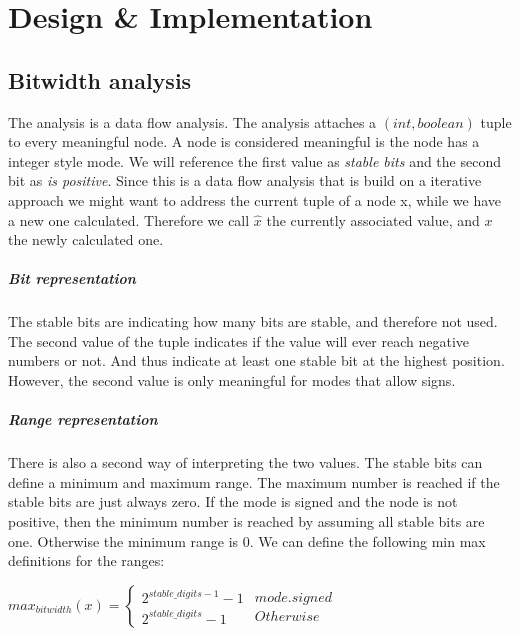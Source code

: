 \chapter{Design \& Implementation}\label{sec:impl}

\section{Bitwidth analysis}
The analysis is a data flow analysis. The analysis attaches a $(int,boolean)$ tuple to every meaningful node. A node is considered meaningful is the node has a integer style mode. We will reference the first value as \emph{stable bits} and the second bit as \emph{is positive}. Since this is a data flow analysis that is build on a iterative approach we might want to address the current tuple of a node x, while we have a new one calculated. Therefore we call $\hat{x}$ the currently associated value, and $x$ the newly calculated one.

\paragraph{Bit representation}
The stable bits are indicating how many bits are stable, and therefore not used.
The second value of the tuple indicates if the value will ever reach negative numbers or not. And thus indicate at least one stable bit at the highest position. However, the second value is only meaningful for modes that allow signs.

\paragraph{Range representation}
There is also a second way of interpreting the two values. The stable bits can define a minimum and maximum range. The maximum number is reached if the stable bits are just always zero. If the mode is signed and the node is not positive, then the minimum number is reached by assuming all stable bits are one. Otherwise the minimum range is 0. We can define the following min max definitions for the ranges:

$
max_{bitwidth}(x)=
\left\{
\begin{array}{l}2^{stable\_digits-1}-1\\2^{stable\_digits}-1\end{array}
\begin{array}{l} {mode.signed} \\ {Otherwise} \end{array}
\right.
$

